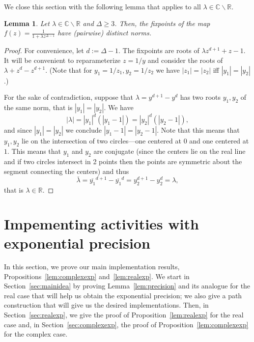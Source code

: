 \documentclass[11pt]{article}
\newtheorem{lemma}[theorem]{Lemma}
\def\Reals{\mathbb{R}}
\def\Complex{\mathbb{C}}
\begin{document}
We close this section with the following lemma that applies to all $\lambda \in \Complex\backslash \Reals$.
\begin{lemma}\label{lem:4frf46}
Let $\lambda\in\Complex\backslash \Reals$ and $\Delta\geq 3$. Then, the fixpoints of the map $f(z)=\frac{1}{1+\lambda z^{\Delta-1}}$ have (pairwise) distinct norms. 
\end{lemma}
\begin{proof}
For convenience, let $d:=\Delta-1$. The fixpoints are roots of $\lambda z^{d+1} + z - 1$. It will be convenient to reparameterize
$z=1/y$ and consider the roots of $\lambda + z^d - z^{d+1}$. (Note that for $y_1=1/z_1, y_2=1/z_2$ we have $|z_1|=|z_2|$ iff $|y_1|=|y_2|$.) 

For the sake of contradiction, suppose that $\lambda = y^{d+1} - y^{d}$
has two roots $y_1,y_2$ of the same norm, that is $|y_1|=|y_2|$. We have
$$|\lambda| = |y_1|^d (|y_1-1|) = |y_2|^d (|y_2-1|),$$
and since $|y_1|=|y_2|$ we conclude $|y_1-1| = |y_2-1|$.
Note that this means that $y_1,y_2$ lie on the intersection of
two circles---one centered at $0$ and one centered at $1$.
This means that $y_1$ and $y_2$ are conjugate (since the centers lie on
the real line and if two circles intersect in 2 points then the
points are symmetric about the segment connecting the centers) and thus
$$
\overline{\lambda} = \overline{y_1}^{d+1} - \overline{y_1}^d = y_2^{d+1} - y_2^d = \lambda,
$$
that is $\lambda\in\Reals$.
\end{proof}

\section{Impementing activities with exponential precision}\label{sec:main1}
In this section, we prove our main implementation results, Propositions~\ref{lem:complexexp} and~\ref{lem:realexp}. We start in Section~\ref{sec:mainidea} by proving Lemma~\ref{lem:precision} and its analogue for the real case that will help us obtain the exponential precision; we also give a path construction that will give us the desired implementations. Then, in Section~\ref{sec:realexp}, we give the proof of Proposition~\ref{lem:realexp} for the real case and, in Section~\ref{sec:complexexp}, the proof of Proposition~\ref{lem:complexexp} for the complex case. 
\end{document}
